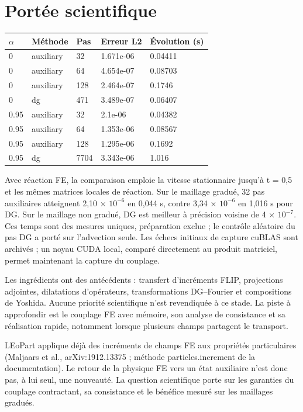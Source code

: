 \documentclass[10pt,a4paper]{article}
\begin{document}
\section{Portée scientifique}
\begin{center}\small\begin{tabular}{lllll}\toprule
\(\alpha\) & Méthode & Pas & Erreur L2 & Évolution (s)\\\midrule
0 & auxiliary & 32 & 1.671e-06 & 0.04411\\
0 & auxiliary & 64 & 4.654e-07 & 0.08703\\
0 & auxiliary & 128 & 2.464e-07 & 0.1746\\
0 & dg & 471 & 3.489e-07 & 0.06407\\
0.95 & auxiliary & 32 & 2.1e-06 & 0.04382\\
0.95 & auxiliary & 64 & 1.353e-06 & 0.08567\\
0.95 & auxiliary & 128 & 1.295e-06 & 0.1692\\
0.95 & dg & 7704 & 3.343e-06 & 1.016\\
\bottomrule\end{tabular}\end{center}
Avec réaction FE, la comparaison emploie la vitesse stationnaire jusqu'à t = 0,5 et les mêmes matrices locales de réaction. Sur le maillage gradué, 32 pas auxiliaires atteignent 2,10 × \(10^{-6}\) en 0,044 s, contre 3,34 × \(10^{-6}\) en 1,016 s pour DG. Sur le maillage non gradué, DG est meilleur à précision voisine de 4 × \(10^{-7}\). Ces temps sont des mesures uniques, préparation exclue ; le contrôle aléatoire du pas DG a porté sur l'advection seule. Les échecs initiaux de capture cuBLAS sont archivés ; un noyau CUDA local, comparé directement au produit matriciel, permet maintenant la capture du couplage.

Les ingrédients ont des antécédents : transfert d'incréments FLIP, projections adjointes, dilatations d'opérateurs, transformations DG–Fourier et compositions de Yoshida. Aucune priorité scientifique n'est revendiquée à ce stade. La piste à approfondir est le couplage FE avec mémoire, son analyse de consistance et sa réalisation rapide, notamment lorsque plusieurs champs partagent le transport.

LEoPart applique déjà des incréments de champs FE aux propriétés particulaires (Maljaars et al., arXiv:1912.13375 ; méthode particles.increment de la documentation). Le retour de la physique FE vers un état auxiliaire n'est donc pas, à lui seul, une nouveauté. La question scientifique porte sur les garanties du couplage contractant, sa consistance et le bénéfice mesuré sur les maillages gradués.
\end{document}
